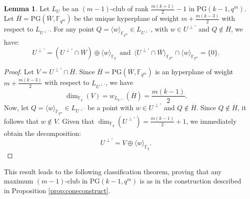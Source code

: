 \documentclass[11pt]{amsart}
\theoremstyle{definition}
\newtheorem{lemma}[theorem]{Lemma}
\newcommand{\la}{\langle}
\newcommand{\ra}{\rangle}
\newcommand{\PG}{\mathrm{PG}}
\newcommand{\fqm}{\mathbb{F}_{q^m}}
\begin{document}
\begin{lemma}\label{le:analysedualset}
Let $L_U$ be an $(m-1)$-club of rank $\frac{m(k+1)}{2} - 1$ in $\mathrm{PG}(k-1,q^m)$.
Let \(\overline{H} = \mathrm{PG}(\overline{W}, \mathbb{F}_{q^m})\) be the unique hyperplane of weight \(m + \frac{m(k - 3)}{2}\) with respect to \(L_{U^{\perp'}}\). For any point \(Q = \langle w \rangle_{\mathbb{F}_{q^m}} \in L_{U^{\perp'}}\), with \(w \in U^{\perp'}\) and \(Q \notin \overline{H}\), we have:
\[
U^{\perp'} = (U^{\perp'} \cap \overline{W}) \oplus \langle w \rangle_{\mathbb{F}_q} \,\,\,\text{and}\,\,\, \la U^{\perp'} \cap \overline{W} \ra_{\fqm}\cap \langle w \rangle_{\fqm}=\{0\}.
\]
\end{lemma}
\begin{proof}
Let \(V = U^{\perp'} \cap \overline{H}\). Since \(\overline{H} = \mathrm{PG}(\overline{W}, \mathbb{F}_{q^m})\) is an hyperplane of weight \(m + \frac{m(k - 3)}{2}\) with respect to \(L_{U^{\perp'}}\), we have
\[
\dim_{\mathbb{F}_q}(V) = w_{L_{U^{\perp'}}}(\overline{H}) = \frac{m(k - 1)}{2}.
\]
Now, let \(Q = \langle w \rangle_{\mathbb{F}_{q^m}} \in L_{U^{\perp'}}\) be a point with \(w \in U^{\perp'}\) and \(Q \notin \overline{H}\). Since \(Q \notin \overline{H}\), it follows that $w \notin V$. Given that \(\dim_{\mathbb{F}_q}(U^{\perp'}) = \frac{m(k - 1)}{2} + 1\), we immediately obtain the decomposition:
\[
U^{\perp'} = V \oplus \langle w \rangle_{\mathbb{F}_q}.
\]
\end{proof}

This result leads to the following classification theorem, proving that any maximum $(m-1)$-club in $\PG(k-1,q^m)$ is as in the construction described in Proposition \ref{prop:coneconstruct}.
\end{document}
